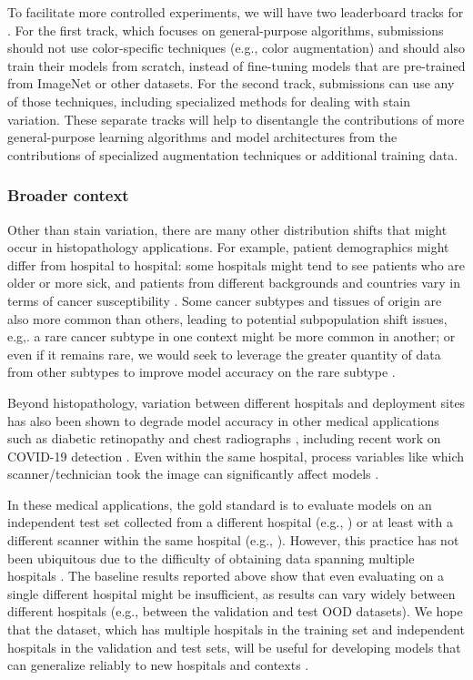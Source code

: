 To facilitate more controlled experiments, we will have two leaderboard tracks for \Camelyon.
For the first track, which focuses on general-purpose algorithms, submissions should not use color-specific techniques (e.g., color augmentation) and should also train their models from scratch, instead of fine-tuning models that are pre-trained from ImageNet or other datasets.
For the second track, submissions can use any of those techniques, including specialized methods for dealing with stain variation.
These separate tracks will help to disentangle the contributions of more general-purpose learning algorithms and model architectures from the contributions of specialized augmentation techniques or additional training data.


\subsubsection{Broader context}
Other than stain variation, there are many other distribution shifts that might occur in histopathology applications. For example, patient demographics might differ from hospital to hospital: some hospitals might tend to see patients who are older or more sick, and patients from different backgrounds and countries vary in terms of cancer susceptibility \citep{henderson2012influence}.
Some cancer subtypes and tissues of origin are also more common than others, leading to potential subpopulation shift issues, e.g,. a rare cancer subtype in one context might be more common in another; or even if it remains rare, we would seek to leverage the greater quantity of data from other subtypes to improve model accuracy on the rare subtype \citep{weinstein2013cancer}.

Beyond histopathology, variation between different hospitals and deployment sites has also been shown to degrade model accuracy in other medical applications such as diabetic retinopathy \citep{beede2020human} and chest radiographs \citep{zech2018radio,phillips2020chexphoto}, including recent work on COVID-19 detection \citep{degrave2020ai}.
Even within the same hospital, process variables like which scanner/technician took the image can significantly affect models \citep{badgeley2019deep}.

In these medical applications, the gold standard is to evaluate models on an independent test set collected from a different hospital (e.g., \citet{beck2011systematic,liu2017detecting,courtiol2019deep,mckinney2020international}) or at least with a different scanner within the same hospital (e.g., \citet{campanella2019clinical}).
However, this practice has not been ubiquitous due to the difficulty of obtaining data spanning multiple hospitals \citep{esteva2017dermatologist,bejnordi2017diagnostic,codella2019skin,veta2019predicting}.
The baseline results reported above show that even evaluating on a single different hospital might be insufficient, as results can vary widely between different hospitals (e.g., between the validation and test OOD datasets).
We hope that the \Camelyon dataset, which has multiple hospitals in the training set and  independent hospitals in the validation and test sets, will be useful for developing models that can generalize reliably to new hospitals and contexts \citep{chen2020ethical}.

